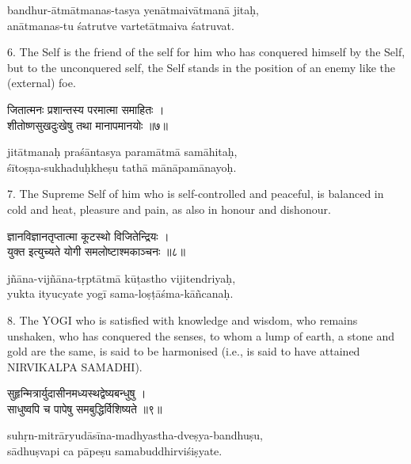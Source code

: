 \begin{transliteration}
bandhur-ātmātmanas-tasya yenātmaivātmanā jitaḥ, \\
anātmanas-tu śatrutve vartetātmaiva śatruvat.
\end{transliteration}

6. The Self is the friend of the self for him who has conquered himself by the
Self, but to the unconquered self, the Self stands in the position of an enemy
like the (external) foe.

\begin{gitaverse}
जितात्मनः प्रशान्तस्य परमात्मा समाहितः । \\
शीतोष्णसुखदुःखेषु तथा मानापमानयोः ॥७॥
\end{gitaverse}

\begin{transliteration}
jitātmanaḥ praśāntasya paramātmā samāhitaḥ, \\
śītoṣṇa-sukhaduḥkheṣu tathā mānāpamānayoḥ.
\end{transliteration}

7. The Supreme Self of him who is self-controlled and peaceful, is balanced in
cold and heat, pleasure and pain, as also in honour and dishonour.

\begin{gitaverse}
ज्ञानविज्ञानतृप्तात्मा कूटस्थो विजितेन्द्रियः । \\
युक्त इत्युच्यते योगी समलोष्टाश्मकाञ्चनः ॥८॥
\end{gitaverse}

\begin{transliteration}
jñāna-vijñāna-tṛptātmā kūṭastho vijitendriyaḥ, \\
yukta ityucyate yogī sama-loṣṭāśma-kāñcanaḥ.
\end{transliteration}

8. The YOGI who is satisfied with knowledge and wisdom, who remains unshaken,
who has conquered the senses, to whom a lump of earth, a stone and gold are the
same, is said to be harmonised (i.e., is said to have attained NIRVIKALPA
SAMADHI).

\begin{gitaverse}
सुहृन्मित्रार्युदासीनमध्यस्थद्वेष्यबन्धुषु । \\
साधुष्वपि च पापेषु समबुद्धिर्विशिष्यते ॥९॥
\end{gitaverse}

\begin{transliteration}
suhṛn-mitrāryudāsīna-madhyastha-dveṣya-bandhuṣu, \\
sādhuṣvapi ca pāpeṣu samabuddhirviśiṣyate.
\end{transliteration}

